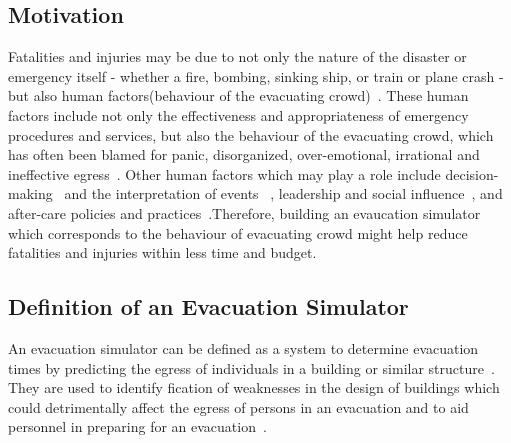 \subsection{Motivation}
Fatalities and injuries may be due to not only the nature of the disaster or emergency itself - whether a fire, 
bombing, sinking ship, or train or plane crash - but also human factors(behaviour of the evacuating crowd)~\cite[Section 1.1]{psychology}. These human factors include not only 
the effectiveness and appropriateness of emergency procedures and services, but also the behaviour of the evacuating crowd,
which has often been blamed for panic, disorganized, over-emotional, irrational and ineffective egress~\cite[Section 1.2]{psychology}. 
Other human factors which may play a role include decision-making~\cite[Section 2.2]{psychology} and the interpretation of events~\cite[Section 2.3]{psychology}
, leadership and social influence~\cite[Section 2.9]{psychology}, 
and after-care policies and practices~\cite[Section 3: Social Identity]{psychology}.Therefore, building an evaucation simulator which corresponds to the behaviour 
of evacuating crowd might help reduce fatalities and injuries within less time and budget.

\subsection{Definition of an Evacuation Simulator}
An evacuation simulator can be defined as a system to determine evacuation
times by predicting the egress of individuals in a building or similar
structure~\cite{evacuationSimulatordefinition}. They are used to identify
fication of weaknesses in the design of buildings which could detrimentally affect
the egress of persons in an evacuation and to aid personnel in
preparing for an evacuation~\cite{evacuationModel}.

